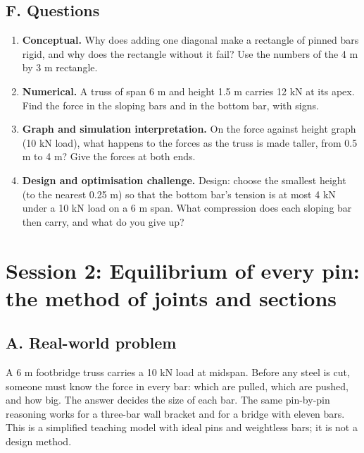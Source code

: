 \documentclass[11pt,a4paper]{article}
\begin{document}
\subsection*{F. Questions}
\begin{enumerate}[nosep]
\item \textbf{Conceptual.} Why does adding one diagonal make a rectangle of pinned bars rigid, and why does the rectangle without it fail? Use the numbers of the 4 m by 3 m rectangle.
\item \textbf{Numerical.} A truss of span 6 m and height 1.5 m carries 12 kN at its apex. Find the force in the sloping bars and in the bottom bar, with signs.
\item \textbf{Graph and simulation interpretation.} On the force against height graph (10 kN load), what happens to the forces as the truss is made taller, from 0.5 m to 4 m? Give the forces at both ends.
\item \textbf{Design and optimisation challenge.} Design: choose the smallest height (to the nearest 0.25 m) so that the bottom bar's tension is at most 4 kN under a 10 kN load on a 6 m span. What compression does each sloping bar then carry, and what do you give up?
\end{enumerate}

\section{Session 2: Equilibrium of every pin: the method of joints and sections}

\subsection*{A. Real-world problem}
A 6 m footbridge truss carries a 10 kN load at midspan. Before any steel is cut, someone must know the force in every bar: which are pulled, which are pushed, and how big. The answer decides the size of each bar. The same pin-by-pin reasoning works for a three-bar wall bracket and for a bridge with eleven bars. This is a simplified teaching model with ideal pins and weightless bars; it is not a design method.
\end{document}
